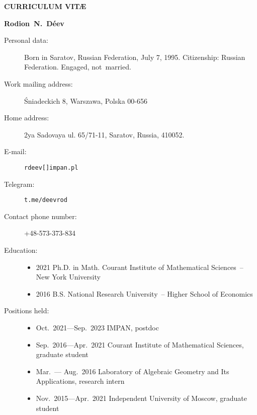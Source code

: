 \documentclass{article}
\begin{document}
\centerline{\bf\large CURRICULUM VIT\AE}

\vspace{3mm}

\centerline{\bf Rodion~N.~D\'eev}

\begin{description}

\item[Personal data:]  Born in Saratov, Russian Federation, July 7, 1995. 
Citizenship: Russian Federation. Engaged, not~married.

\item[Work mailing address:] \'Sniadeckich 8,  Warszawa,  Polska 00-656

\item[Home address:] 2ya Sadovaya ul. 65/71-11, Saratov, Russia,
410052.

\item[E-mail:] {\tt rdeev[]impan.pl}

\item[Telegram:] {\tt t.me/deevrod}

\item[Contact phone number:] +48-573-373-834

\item[Education:] \begin{itemize}
     \item 2021 \hspace{2mm} Ph.D. in Math. \hspace{2mm} Courant
     Institute of Mathematical Sciences~-- New York University
     \item 2016 \hspace{2mm} B.S. \hspace{2mm} National Research
     University~-- Higher School of Economics
\end{itemize}

\item[Positions held:] \begin{itemize}
     \item Oct.~2021---Sep.~2023 \hspace{2mm} IMPAN,  postdoc
     \item Sep.~2016---Apr.~2021 \hspace{2mm} Courant Institute of Mathematical Sciences,
     graduate student
     \item Mar.~--- Aug.~2016 \hspace{2mm} Laboratory of Algebraic Geometry
	and Its Applications, research intern
     \item Nov.~2015---Apr.~2021 \hspace{2mm} Independent University of Moscow,
     graduate student
\end{itemize}


\end{description}
\end{document}
